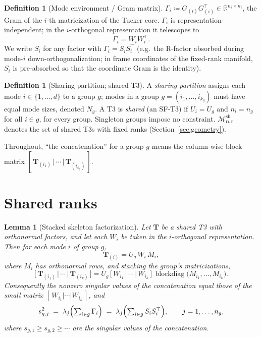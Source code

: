 \documentclass[11pt]{article}
\newtheorem{lemma}[theorem]{Lemma}
\theoremstyle{definition}
\newtheorem{definition}[theorem]{Definition}
\theoremstyle{remark}
\newcommand{\R}{\mathbb{R}}
\newcommand{\T}{\boldsymbol{T}}
\newcommand{\Msh}{\mathcal{M}^{\mathrm{sh}}_{\boldsymbol{n},\boldsymbol{r}}}
\begin{document}
\begin{definition}[Mode environment / Gram matrix]\label{def:gram}
$\Gamma_i \coloneqq G_{(i)} G_{(i)}^\top \in \R^{n_i \times n_i}$, the Gram of
the $i$-th matricization of the Tucker core. $\Gamma_i$ is
representation-independent; in the $i$-orthogonal representation it
telescopes to
\[
\Gamma_i = W_i W_i^\top .
\]
We write $S_i$ for any factor with $\Gamma_i = S_i S_i^\top$ (e.g.\ the
R-factor absorbed during mode-$i$ down-orthogonalization; in frame coordinates
of the fixed-rank manifold, $S_i$ is pre-absorbed so that the coordinate Gram
is the identity).
\end{definition}

\begin{definition}[Sharing partition; shared T3]\label{def:sharing}
A \emph{sharing partition} assigns each mode $i \in \{1,\ldots,d\}$ to a group
$g$; modes in a group $g = (i_1, \ldots, i_{k_g})$ must have equal mode sizes,
denoted $N_g$. A T3 is \emph{shared} (an SF-T3) if $U_{i} = U_{g}$ and
$n_i = n_g$ for all $i \in g$, for every group. Singleton groups impose no
constraint. $\Msh$ denotes the set of shared T3s with fixed ranks
(Section~\ref{sec:geometry}).
\end{definition}

Throughout, ``the concatenation'' for a group $g$ means the column-wise block
matrix $[\,\T_{(i_1)} \,|\, \cdots \,|\, \T_{(i_{k_g})}\,]$.

\section{Shared ranks}\label{sec:ranks}

\begin{lemma}[Stacked skeleton factorization]\label{lem:skeleton}
Let $\T$ be a shared T3 with orthonormal factors, and let each $W_i$ be taken
in the $i$-orthogonal representation. Then for each mode $i$ of group $g$,
\begin{equation}\label{eq:skeleton}
\T_{(i)} = U_g\, W_i\, M_i,
\end{equation}
where $M_i$ has orthonormal rows, and stacking the group's matricizations,
\begin{equation}\label{eq:stacked}
\bigl[\,\T_{(i_1)} \,|\, \cdots \,|\, \T_{(i_k)}\,\bigr]
= U_g \,\bigl[\, W_{i_1} \,|\, \cdots \,|\, W_{i_k} \,\bigr]\,
\operatorname{blockdiag}\!\bigl(M_{i_1}, \ldots, M_{i_k}\bigr).
\end{equation}
Consequently the nonzero singular values of the concatenation equal those of
the small matrix $[\,W_{i_1} | \cdots | W_{i_k}\,]$, and
\begin{equation}\label{eq:specid}
s_{g,j}^2 \;=\;
\lambda_j\Bigl(\textstyle\sum_{i \in g} \Gamma_i\Bigr)
\;=\;
\lambda_j\Bigl(\textstyle\sum_{i \in g} S_i S_i^\top\Bigr),
\qquad j = 1, \ldots, n_g,
\end{equation}
where $s_{g,1} \geq s_{g,2} \geq \cdots$ are the singular values of the
concatenation.
\end{lemma}
\end{document}
